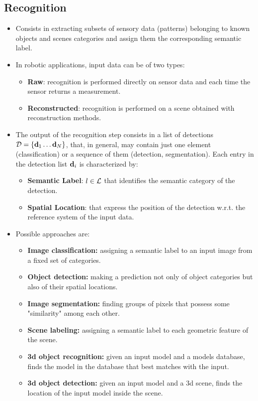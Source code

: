 \documentclass{article}
\begin{document}
	\subsection{Recognition}
	
%	
	\begin{itemize}
		\item Consists in extracting subsets of sensory data (patterns) belonging to known objects and scenes categories and assign them the corresponding semantic label.
		\item In robotic applications, input data can be of two types:
		\begin{itemize}
			\item {\bf Raw}: recognition is performed directly on sensor data and each time the sensor returns a measurement.
			\item {\bf Reconstructed}: recognition is performed on a scene obtained with reconstruction methods.
		\end{itemize}
		\item The output of the recognition step consists in a list of detections $\mathcal{D} = \{ \mathbf{d}_1 \dots \mathbf{d}_N \}$, that, in general, may contain just one element (classification) or a sequence of them (detection, segmentation). Each entry in the detection list $\mathbf{d}_i$ is characterized by: 
		\begin{itemize}
			\item {\bf Semantic Label}: $l \in \mathcal{L}$ that identifies the semantic category of the detection. 
			\item {\bf Spatial Location}: that express the position of the detection w.r.t. the reference system of the input data.
		\end{itemize}
		\item 	Possible approaches are:
		\begin{itemize}
			\item {\bf Image classification:} assigning a semantic label to an input image from a fixed set of categories.
			\item {\bf Object detection:} making a prediction not only of object categories but also of their spatial locations.
			\item {\bf Image segmentation:} finding groups of pixels that possess some "similarity" among each other.
			\item {\bf Scene labeling:} assigning a semantic label to each geometric feature of the scene.
			\item {\bf 3d object recognition:} given an input model and a models database, finds the model in the database that best matches with the input.
			\item {\bf 3d object detection:} given an input model and a 3d scene, finds the location of the input model inside the scene.
		\end{itemize}
	\end{itemize}
\end{document}

